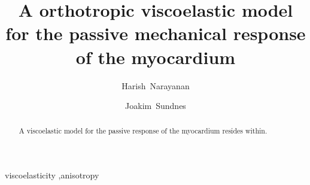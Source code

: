 \begin{frontmatter}

\title{A orthotropic viscoelastic model for the passive mechanical
  response of the myocardium}

\author[srl]{Harish~Narayanan}
\author[srl]{Joakim~Sundnes}

\address[srl]{Center for Biomedical Computing, Simula Research
  Laboratory\\ P.O.~Box~134, 1325~Lysaker, Norway}

\begin{abstract}
  A viscoelastic model for the passive response of the myocardium
  resides within.
\end{abstract}

\begin{keyword}
viscoelasticity \sep anisotropy
\end{keyword}

\end{frontmatter}

%

